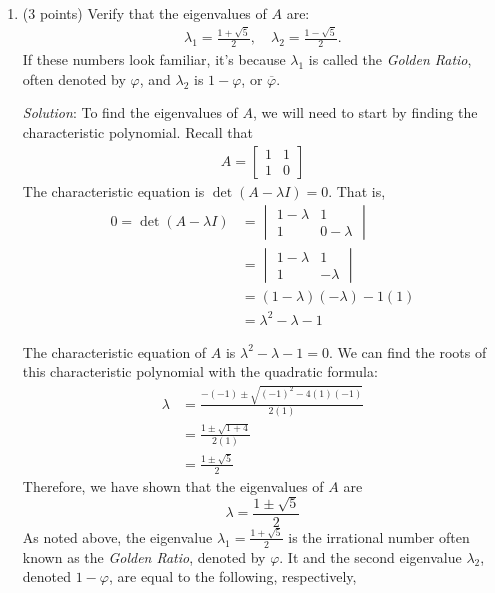 \documentclass{article}
\begin{document}
\begin{enumerate}

  \item (3 points) Verify that the eigenvalues of $A$ are:
        \begin{align*}
          \lambda_1 = \frac{1 + \sqrt{5}}{2}, \quad \lambda_2 = \frac{1 - \sqrt{5}}{2}.
        \end{align*}
        If these numbers look familiar, it's because $\lambda_1$ is called the \emph{Golden Ratio}, often denoted by $\varphi$, and $\lambda_2$ is $1 - \varphi$, or $\overline{\varphi}$.

        \emph{Solution}: To find the eigenvalues of $A$, we will need to start by finding the characteristic polynomial. Recall that
        \begin{align*}
          A = \begin{bmatrix}
                1 & 1 \\
                1 & 0
              \end{bmatrix}
        \end{align*}
        The characteristic equation is $\det(A - \lambda I) = 0$. That is,
        \begin{align*}
          0 = \det(A - \lambda I) & = \begin{vmatrix}
                                        1 - \lambda & 1           \\
                                        1           & 0 - \lambda
                                      \end{vmatrix}     \\
                                  & = \begin{vmatrix}
                                        1 - \lambda & 1         \\
                                        1           & - \lambda
                                      \end{vmatrix}       \\
                                  & = (1 - \lambda)(- \lambda) - 1(1) \\
                                  & = \lambda^2 -\lambda - 1
        \end{align*}

        The characteristic equation of $A$ is $\lambda^2 -\lambda - 1 = 0$. We can find the roots of this characteristic polynomial with the quadratic formula:
        \begin{align*}
          \lambda & = \frac{-(-1) \pm \sqrt{(-1)^2 - 4(1)(-1)}}{2(1)} \\
                  & = \frac{1 \pm \sqrt{1 + 4}}{2(1)}                 \\
                  & = \frac{1 \pm \sqrt{5}}{2}
        \end{align*}
        Therefore, we have shown that the eigenvalues of $A$ are
        \[
          \boxed{\lambda=\frac{1\pm\sqrt{5}}{2}}
        \]
        As noted above, the eigenvalue $\lambda_1 = \frac{1 + \sqrt{5}}{2}$ is the  irrational number often known as the \textit{Golden Ratio}, denoted by $\varphi$. It and the second eigenvalue $\lambda_2$, denoted $1 - \varphi$, are equal to the following, respectively,


\end{enumerate}
\end{document}
